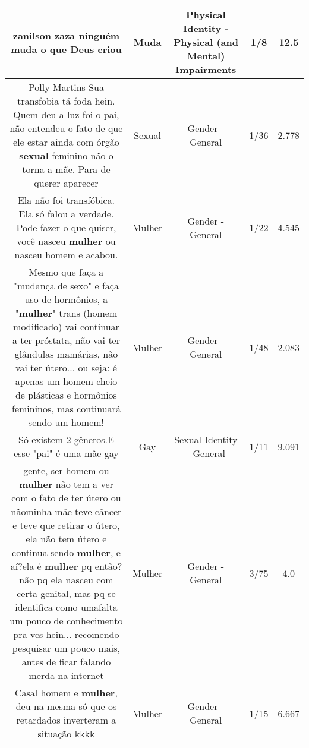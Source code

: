 \documentclass[11pt]{article}
\newlength\mylength
\begin{document}
\begin{center}
\begin{longtable}{|C{.65\mylength}|C{.30\mylength}|C{.12\mylength}|C{.12\mylength}|C{.12\mylength}|}
  \small zanilson zaza ninguém \textbf{muda} o que Deus criou\normalsize   & Muda & Physical Identity - Physical (and Mental) Impairments & 1/8 & 12.5 \\  \hline
  \small Polly Martins Sua transfobia tá foda hein. Quem deu a luz foi o pai,  não entendeu o fato de que ele estar ainda com órgão \textbf{sexual} feminino não o torna a mãe. Para de querer aparecer\normalsize   & Sexual & Gender - General & 1/36 & 2.778 \\  \hline
  \small Ela não foi transfóbica. Ela só falou a verdade. Pode fazer o que quiser, você nasceu \textbf{mulher} ou nasceu homem e acabou.\normalsize   & Mulher & Gender - General & 1/22 & 4.545 \\  \hline
  \small Mesmo que faça a "mudança de sexo" e faça uso de hormônios, a "\textbf{mulher}" trans (homem modificado) vai continuar a ter próstata, não vai ter glândulas mamárias, não vai ter útero... ou seja: é apenas um homem cheio de plásticas e hormônios femininos, mas continuará sendo um homem!\normalsize   & Mulher & Gender - General & 1/48 & 2.083 \\  \hline
  \small Só existem 2 gêneros.E esse "pai" é uma mãe gay\normalsize   & Gay & Sexual Identity - General & 1/11 & 9.091 \\  \hline
  \small gente, ser homem ou \textbf{mulher} não tem a ver com o fato de ter útero ou nãominha mãe teve câncer e teve que retirar o útero, ela não tem útero e continua sendo \textbf{mulher}, e aí?ela é \textbf{mulher} pq então? não pq ela nasceu com certa genital, mas pq se identifica como umafalta um pouco de conhecimento pra vcs hein... recomendo pesquisar um pouco mais, antes de ficar falando merda na internet\normalsize   & Mulher & Gender - General & 3/75 & 4.0 \\  \hline
  \small Casal homem e \textbf{mulher}, deu na mesma só que os retardados inverteram a situação kkkk\normalsize   & Mulher & Gender - General & 1/15 & 6.667 \\  \hline

\end{longtable}
\end{center}
\end{document}
